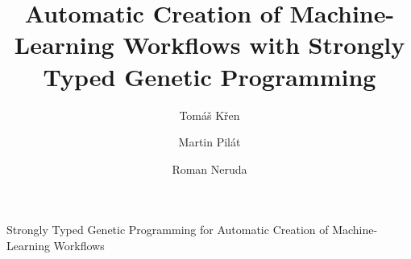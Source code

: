 \documentclass{ws-ijait}
\begin{document}
\newcommand{\red}[1]{{\color{red} #1}}

{Strongly Typed Genetic Programming for Automatic Creation of Machine-Learning
Workflows}

%
\catchline{}{}{}{}{}
%

\title{Automatic Creation of Machine-Learning Workflows with Strongly Typed
Genetic Programming}


\author{Tom\'a\v{s} K\v{r}en}

\address{Charles University, Faculty of Mathematics and Physics, Malostransk\'e
n\'am\v{e}st\'i 25, 118 00 Prague, Czech Republic, Tomas.Kren@mff.cuni.cz}

\author{Martin Pil\'at}
\address{Charles University, Faculty of Mathematics and Physics, Malostransk\'e
n\'am\v{e}st\'i 25, 118 00 Prague, Czech Republic, Martin.Pilat@mff.cuni.cz}


\author{Roman Neruda}
\address{Institute of Computer Science, The Czech Academy of Sciences, 
Pod Vod\'arenskou v\v{e}\v{z}\'i 271/2, 182 07 Prague, Czech Republic, 
roman@cs.cas.cz}

\newcommand{\ar}{\rightarrow}
\newcommand{\Dlong}{unlabeled data\xspace}
\newcommand{\LDlong}{labeled data\xspace}
\newcommand{\Dshort}{\textit{$D$}\xspace}
\newcommand{\LDshort}{\textit{$LD$}\xspace}
\newcommand{\dia}{\textit{$ens_1$}\xspace}
\newcommand{\diaZero}{\textit{$ens_0$}\xspace}
\newcommand{\splitComb}{\textit{$split$}\xspace}
\newcommand{\cons}{\textit{$cons$}\xspace}

\newcommand{\komb}[1]{\textit{#1}}
\newcommand{\kons}[1]{\textit{#1}}

\newcommand{\Dag}{\kons{Dag}}
\newcommand{\D}{\kons{D}}
\newcommand{\LD}{\kons{LD}}
\newcommand{\Boo}{\kons{Boo}}
\newcommand{\V}{\kons{V}}
\newcommand{\Succ}{\kons{S}}
\newcommand{\Zero}{\kons{0}}
\newcommand{\Same}{\kons{Same}}
\newcommand{\Disjoint}{\kons{Disjoint}}

\newcommand{\Suc}[1]{(\Succ\ #1)}
\newcommand{\Ve}[3]{(\V\ #1\ #2\ #3)}

\newcommand{\DAG}[2]{(\Dag\ #1\ #2)}
\newcommand{\splitter}[4]{\DAG{#1}{\Ve{#2}{#3}{#4}}}
\newcommand{\merger}[4]{\DAG{\Ve{#1}{#3}{#4}}{#2}}
\newcommand{\dvaPlus}[1]{\Suc{\Suc{#1}}}
\newcommand{\dva}{\dvaPlus{\Zero}}



\newcommand{\la}{\leftarrow\xspace}
\newcommand{\op}{\operatorname}
\newcommand{\mgu}[1]{\op{MGU}(#1)}
\end{document}
